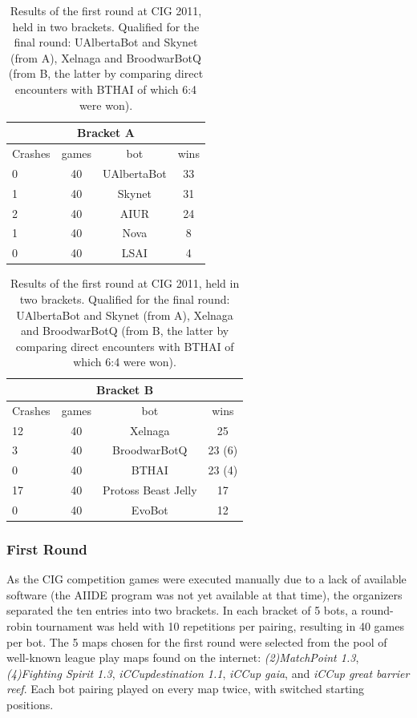 \documentclass[journal]{IEEEtran}
\begin{document}
\begin{table}[t!]
\caption{Results of the first round at CIG 2011, held in two brackets.
Qualified for the final round: UAlbertaBot and Skynet (from A), Xelnaga
and BroodwarBotQ (from B, the latter by comparing direct encounters
with BTHAI of which 6:4 were won).}
\label{tab:cig-first-round}
\begin{small}
\begin{center}
\begin{tabular}{|l|c|c|c|}
\hline
\multicolumn{4}{|c|}{Bracket A} \\ \hline
Crashes & games & bot	& wins\\ \hline
0 &	 40 &	 UAlbertaBot &	 33\\
1 &   40 &	 Skynet	  &  31\\
2 &	 40 &	 AIUR	  &  24\\
1 &	 40 &	 Nova	  &  8\\
0 &	 40 &	 LSAI	  &  4\\
\hline
\end{tabular}
\begin{tabular}{|l|c|c|c|}
\hline
\multicolumn{4}{|c|}{Bracket B} \\ \hline
Crashes & games & bot	& wins\\ \hline
12 &	 40 &	 Xelnaga &	 25\\
3 &   40 &	 BroodwarBotQ  &  23 (6)\\
0 &	 40 &	 BTHAI	  &  23 (4)\\
17 &	 40 &	 Protoss Beast Jelly  & 17\\
0 &	 40 &	 EvoBot	  &  12\\
\hline
\end{tabular}
\end{center}
\end{small}
\end{table}

\subsubsection{First Round}
\label{sec:cig-first-round}

As the CIG competition games were executed manually due to
a lack of available software (the AIIDE program was not yet
available at that time), the organizers separated the ten entries into
two brackets. In each bracket of 5 bots, a round-robin
tournament was held with 10 repetitions per pairing, resulting
in 40 games per bot.
The 5 maps chosen for the first round were selected from the pool
of well-known league play maps found on the internet:
\emph{(2)MatchPoint 1.3}, \emph{(4)Fighting Spirit 1.3}, 
\emph{iCCupdestination 1.1}, \emph{iCCup gaia}, and 
\emph{iCCup great barrier reef}. Each bot pairing played
on every map twice, with switched starting positions.
\end{document}
